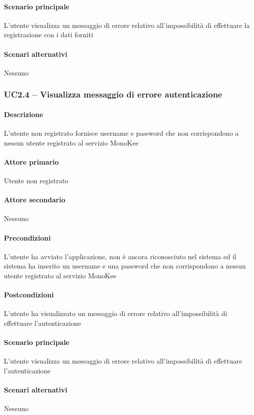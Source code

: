 \paragraph{Scenario principale}  
L’utente visualizza un messaggio di errore relativo all’impossibilità di effettuare la registrazione con i dati forniti
\paragraph{Scenari alternativi}  Nessuno



\subsubsection{UC2.4 – Visualizza messaggio di errore autenticazione}
\paragraph{Descrizione}  L’utente non registrato fornisce username e password che non corrispondono a nessun utente registrato al servizio MonoKee
\paragraph{Attore primario}  Utente non registrato
\paragraph{Attore secondario}  Nessuno
\paragraph{Precondizioni}  L’utente ha avviato l’applicazione, non è ancora riconosciuto nel sistema ed il sistema ha inserito un username e una password che non corrispondono a nessun utente registrato al servizio MonoKee
\paragraph{Postcondizioni}  L’utente ha visualizzato un messaggio di errore relativo all’impossibilità di effettuare l’autenticazione
\paragraph{Scenario principale}  
L’utente visualizza un messaggio di errore relativo all’impossibilità di effettuare l’autenticazione
\paragraph{Scenari alternativi}  Nessuno



